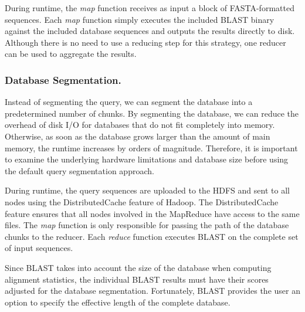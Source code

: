 During runtime, the \emph{map} function receives as input a block of FASTA-formatted sequences.
Each \emph{map} function simply executes the included BLAST binary against the included database sequences and outputs the results directly to disk.
Although there is no need to use a reducing step for this strategy, one reducer can be used to aggregate the results.

\subsubsection{Database Segmentation.}

Instead of segmenting the query, we can segment the database into a predetermined number of chunks.
By segmenting the database, we can reduce the overhead of disk I/O for databases that do not fit completely into memory.
Otherwise, as soon as the database grows larger than the amount of main memory, the runtime increases by orders of magnitude\cite{darling2003design}.
Therefore, it is important to examine the underlying hardware limitations and database size before using the default query segmentation approach.

During runtime, the query sequences are uploaded to the HDFS and sent to all nodes using the DistributedCache feature of Hadoop.  The DistributedCache feature ensures that all nodes involved in the MapReduce have access to the same files.  The \emph{map} function is only responsible for passing the path of the database chunks to the reducer.  Each \emph{reduce} function executes BLAST on the complete set of input sequences.

Since BLAST takes into account the size of the database when computing alignment statistics, the individual BLAST results must have their scores adjusted for the database segmentation.
Fortunately, BLAST provides the user an option to specify the effective length of the complete database.

